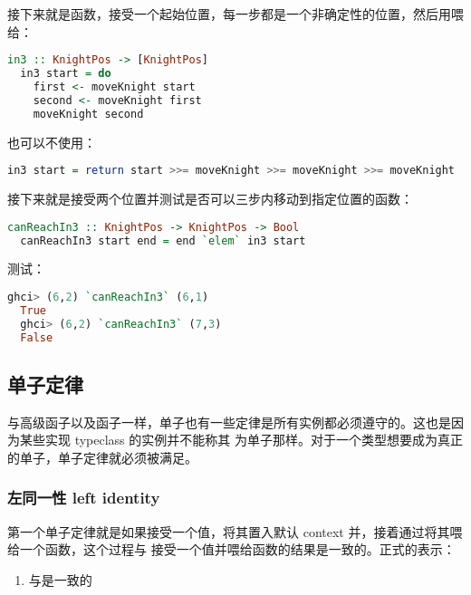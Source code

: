 \documentclass[./main.tex]{subfiles}
\begin{document}
接下来就是函数，接受一个起始位置，每一步都是一个非确定性的位置，然后用\acode{>>=}喂给：

\begin{lstlisting}[language=Haskell]
  in3 :: KnightPos -> [KnightPos]
  in3 start = do
    first <- moveKnight start
    second <- moveKnight first
    moveKnight second
\end{lstlisting}

也可以不使用：

\begin{lstlisting}[language=Haskell]
  in3 start = return start >>= moveKnight >>= moveKnight >>= moveKnight
\end{lstlisting}

接下来就是接受两个位置并测试是否可以三步内移动到指定位置的函数：

\begin{lstlisting}[language=Haskell]
  canReachIn3 :: KnightPos -> KnightPos -> Bool
  canReachIn3 start end = end `elem` in3 start
\end{lstlisting}

测试：

\begin{lstlisting}[language=Haskell]
  ghci> (6,2) `canReachIn3` (6,1)
  True
  ghci> (6,2) `canReachIn3` (7,3)
  False
\end{lstlisting}

\subsection*{单子定律}

与高级函子以及函子一样，单子也有一些定律是所有实例都必须遵守的。这也是因为某些实现 typeclass 的实例并不能称其
为单子那样。对于一个类型想要成为真正的单子，单子定律就必须被满足。

\subsubsection*{左同一性 left identity}

第一个单子定律就是如果接受一个值，将其置入默认 context 并，接着通过\acode{>>=}将其喂给一个函数，这个过程与
接受一个值并喂给函数的结果是一致的。正式的表示：

\begin{enumerate}
  \item {}与是一致的
\end{enumerate}
\end{document}
